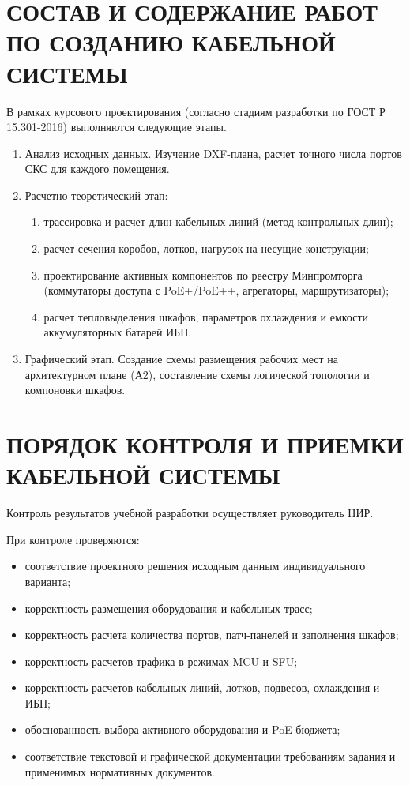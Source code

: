 \documentclass{bmstu}
\begin{document}
\begin{appendices}
\section{СОСТАВ И СОДЕРЖАНИЕ РАБОТ ПО СОЗДАНИЮ КАБЕЛЬНОЙ СИСТЕМЫ}
В рамках курсового проектирования (согласно стадиям разработки по ГОСТ Р 15.301-2016) выполняются следующие этапы.
\begin{enumerate}[label=\thechapter.\arabic*]
    \item Анализ исходных данных. Изучение DXF-плана, расчет точного числа портов СКС для каждого помещения.
    \item Расчетно-теоретический этап:
    \begin{enumerate}[label=\asbuk*)]
        \item трассировка и расчет длин кабельных линий (метод контрольных длин);
        \item расчет сечения коробов, лотков, нагрузок на несущие конструкции;
        \item проектирование активных компонентов по реестру Минпромторга (коммутаторы доступа с PoE+/PoE++, агрегаторы, маршрутизаторы);
        \item расчет тепловыделения шкафов, параметров охлаждения и емкости аккумуляторных батарей ИБП.
    \end{enumerate}
    \item Графический этап. Создание схемы размещения рабочих мест на архитектурном плане (А2), составление схемы логической топологии и компоновки шкафов.
\end{enumerate}



\section{ПОРЯДОК КОНТРОЛЯ И ПРИЕМКИ КАБЕЛЬНОЙ СИСТЕМЫ}

Контроль результатов учебной разработки осуществляет руководитель НИР.

При контроле проверяются:

\begin{itemize}[label=\asbuk*)]
    \item соответствие проектного решения исходным данным индивидуального варианта;
    \item корректность размещения оборудования и кабельных трасс;
    \item корректность расчета количества портов, патч-панелей и заполнения шкафов;
    \item корректность расчетов трафика в режимах MCU и SFU;
    \item корректность расчетов кабельных линий, лотков, подвесов, охлаждения и ИБП;
    \item обоснованность выбора активного оборудования и PoE-бюджета;
    \item соответствие текстовой и графической документации требованиям задания и применимых нормативных документов.
\end{itemize}


\end{appendices}
\end{document}
